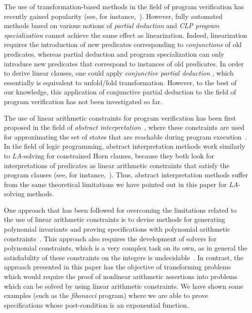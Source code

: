 \documentclass[english]{tlp}
\begin{document}
The use of transformation-based methods in the field of program verification 
has recently gained  popularity  (see, 
for instance,~\cite{Al&07,De&14c,Fi&13a,KaG15a,LeM99,LiN08,Pe&98}). 
However, fully automated methods based on various notions
of {\it partial deduction} and {\it CLP program specialization} cannot
achieve the same effect as {\rm linearization}. Indeed, 
{\rm linearization} requires the introduction of new predicates corresponding
to {\it conjunctions} of old {predicates}, whereas {partial deduction} and {program specialization}
can only introduce new predicates that correspond to instances of old 
{predicates}.
In order to derive linear clauses, one could apply {\it conjunctive partial deduction}
\cite{De&99}, which essentially is equivalent to unfold/fold transformation. However, 
to the best of our knowledge, this 
application of conjunctive partial deduction to the field of program verification
has not been investigated {so far}.


The use of linear arithmetic constraints for program verification
has been first proposed in the field of 
{\it abstract interpretation}~\cite{CoC77}, where
these constraints are used for approximating the set of states that
are reachable during program execution~\cite{CoH78}.
In the field of logic programming, abstract interpretation methods work similarly to 
{\it LA}-solving for constrained Horn clauses, 
because they both 
look for interpretations of predicates as linear arithmetic 
constraints that satisfy {the} program clauses 
(see, for instance,~\cite{BeK96}).
Thus, abstract interpretation methods suffer from the 
same theoretical limitations we 
have pointed out in this paper for {\it LA}-solving methods.

One approach that has been followed for overcoming the limitations
related to the use of linear arithmetic constraints is to
devise methods for generating polynomial invariants and proving
specifications with polynomial arithmetic constraints~\cite{RoK07a,RoK07b}. 
This approach also requires the development
of solvers for polynomial constraints, which is a very complex task on its own,
as in general the satisfiability of these constraints on the integers 
is undecidable~\cite{Mat70}.
In contrast, the approach presented in this paper  has the objective of transforming
problems which would require the proof of nonlinear 
arithmetic assertions into problems
which can be solved by using linear arithmetic constraints.
We have shown some examples (such as the  {\it fibonacci} program)
where we are able to prove specifications whose post-condition
is an exponential function.
\end{document}
